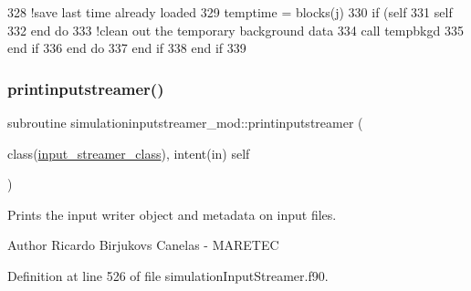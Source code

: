 \begin{DoxyCode}
328                         \textcolor{comment}{!save last time already loaded}
329                         temptime = blocks(j)%
330                         \textcolor{keywordflow}{if} (self%
331                         self%
332 \textcolor{keywordflow}{                    end do}
333                     \textcolor{comment}{!clean out the temporary background data}
334                     \textcolor{keyword}{call }tempbkgd%
335 \textcolor{keywordflow}{                end if}
336 \textcolor{keywordflow}{            end do}
337 \textcolor{keywordflow}{        end if}
338 \textcolor{keywordflow}{    end if}
339 
\end{DoxyCode}
\mbox{\label{namespacesimulationinputstreamer__mod_a1b906bc5ba1fac8d846b30237216aca4}} 
\subsubsection{\texorpdfstring{printinputstreamer()}{printinputstreamer()}}
{\footnotesize\ttfamily subroutine simulationinputstreamer\+\_\+mod\+::printinputstreamer (\begin{DoxyParamCaption}\item[{class(\mbox{\hyperlink{structsimulationinputstreamer__mod_1_1input__streamer__class}{input\+\_\+streamer\+\_\+class}}), intent(in)}]{self }\end{DoxyParamCaption})\hspace{0.3cm}{\ttfamily [private]}}



Prints the input writer object and metadata on input files. 

\begin{DoxyAuthor}{Author}
Ricardo Birjukovs Canelas -\/ M\+A\+R\+E\+T\+EC 
\end{DoxyAuthor}


Definition at line 526 of file simulation\+Input\+Streamer.\+f90.


